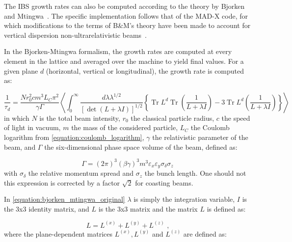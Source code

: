 The IBS growth rates can also be computed according to the theory by Bjorken and Mtingwa~\cite{CERN:Bjorken_Mtingwa:Intrabeam_Scattering}.
The specific implementation follows that of the MAD-X code, for which modifications to the terms of B\&M's theory have been made to account for vertical dispersion non-ultrarelativistic beams~\cite{CERN:Antoniou:Revision_IBS_MADX}.
\newline

In the Bjorken-Mtingwa formalism, the growth rates are computed at every element in the lattice and averaged over the machine to yield final values.
For a given plane \(d\) (horizontal, vertical or longitudinal), the growth rate is computed as:

\begin{equation}
    \frac{1}{\tau_d} = \frac{N r_0^{2} c m^3 L_C \pi^{2}}{\gamma \Gamma} \left\langle \int_0^{\infty} \frac{d \lambda \lambda^{1 / 2}}{\left[\operatorname{det}(L + \lambda I)\right]^{1/2}} \left\{\operatorname{Tr} L^d \operatorname{Tr}\left(\frac{1}{L + \lambda I}\right) - 3 \operatorname{Tr} L^d \left(\frac{1}{L + \lambda I}\right)\right\}\right\rangle
    \label{equation:bjorken_mtingwa_original}
\end{equation}
in which \(N\) is the total beam intensity, \(r_0\) the classical particle radius, \(c\) the speed of light in vacuum, \(m\) the mass of the considered particle, \(L_C\) the Coulomb logarithm from \eqref{equation:coulomb_logarithm}, \(\gamma\) the relativistic parameter of the beam, and \(\Gamma\) the six-dimensional phase space volume of the beam, defined as:

\begin{equation}
    \Gamma = \left( 2 \pi \right)^3 \left( \beta \gamma \right)^3 m^3 \varepsilon_x \varepsilon_y \sigma_{\delta} \sigma_z
\end{equation}
with \(\sigma_{\delta}\) the relative momentum spread and \(\sigma_z\) the bunch length.
One should not this expression is corrected by a factor \(\sqrt{2}\) for coasting beams.

In \eqref{equation:bjorken_mtingwa_original} \(\lambda\) is simply the integration variable, \(I\) is the 3x3 identity matrix, and \(L\) is the 3x3 matrix and the matrix \(L\) is defined as:

\begin{equation}
    L = L^{(x)} + L^{(y)} + L^{(z)} \text{ ,}
\end{equation}
where the plane-dependent matrices \(L^{(x)}, L^{(y)}\) and \(L^{(z)}\) are defined as:

